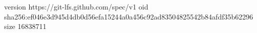 version https://git-lfs.github.com/spec/v1
oid sha256:ef046e3d945d4db0d56efa15244a0a456c92ad83504825542b84afdf35b62296
size 16838711
